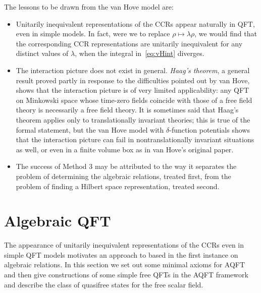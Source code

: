 \documentclass[12pt,a4paper]{article}
\newcommand{\1}{\mathds{1}}                         %
\begin{document}
	The lessons to be drawn from the van Hove model are:
	\begin{itemize}
		\item Unitarily inequivalent representations of the CCRs appear naturally in QFT, even in simple models. In fact, were we to replace $\rho\mapsto  \lambda\rho$, we would find that the corresponding CCR representations are unitarily inequivalent for any distinct values of $\lambda$, when the integral in~\eqref{eq:vHint} diverges.
		\item The interaction picture does not exist in general.  \emph{Haag's theorem}, a general result proved partly in response to the difficulties pointed out by van Hove, shows that the interaction picture is of very limited applicability: any QFT on Minkowski space whose time-zero fields coincide with those of a free field theory is necessarily a free field theory. It is sometimes said that Haag's theorem applies only to translationally invariant theories; this is true of the formal statement, but the van Hove model with $\delta$-function potentials shows that the interaction picture can fail in nontranslationally invariant situations as well, or even in a finite volume box as in van Hove's original paper.
		\item The success of Method 3 may be attributed to the way it separates the problem of determining the algebraic relations, treated first, from the problem of finding a Hilbert space representation, treated second. 
	\end{itemize} 
	
	
	\section{Algebraic QFT}\label{sec:AQFT}
	The appearance of unitarily inequivalent representations of the CCRs even in simple QFT models motivates an approach to based in the first instance on algebraic relations. In this section we set out some minimal axioms for AQFT and then give constructions of some simple free QFTs in the AQFT framework and describe the class of quasifree states for the free scalar field. 
\end{document}
